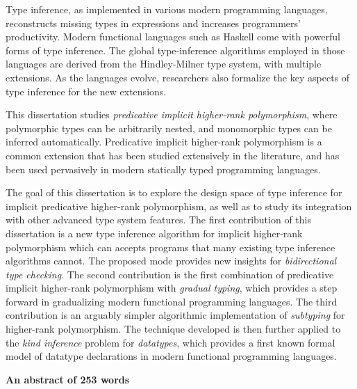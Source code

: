 %
\noindent

Type inference, as implemented in various modern programming languages,
reconstructs missing types in expressions and increases programmers'
productivity. Modern functional languages such as Haskell come with powerful
forms of type inference. The global type-inference algorithms employed in those
languages are derived from the Hindley-Milner type system, with multiple
extensions. As the languages evolve, researchers also formalize the key aspects
of type inference for the new extensions.

This dissertation studies \textit{predicative implicit higher-rank
  polymorphism}, where polymorphic types can be arbitrarily nested, and
monomorphic types can be inferred automatically. Predicative implicit
higher-rank polymorphism is a common extension that has been studied extensively
in the literature, and has been used pervasively in modern statically typed
programming languages.

The goal of this dissertation is to explore the design space of type inference
for implicit predicative higher-rank polymorphism, as well as to study its
integration with other advanced type system features. The first contribution of
this dissertation is a new type inference algorithm for implicit higher-rank
polymorphism which can accepts programs that many existing type inference
algorithms cannot. The proposed \textit{\mode} mode provides new insights for
\textit{bidirectional type checking}. The second contribution is the first
combination of predicative implicit higher-rank polymorphism with
\textit{gradual typing}, which provides a step forward in gradualizing modern
functional programming languages. The third contribution is an arguably simpler
algorithmic implementation of \textit{subtyping} for higher-rank polymorphism.
The technique developed is then further applied to the \textit{kind inference}
problem for \textit{datatypes}, which provides a first known formal model of
datatype declarations in modern functional programming languages.



\vspace{1\baselineskip}

\noindent\makebox[\linewidth]{\rule{0.7\textwidth}{0.4pt}}

\begin{center}
  \textbf{An abstract of 253 words}
\end{center}



